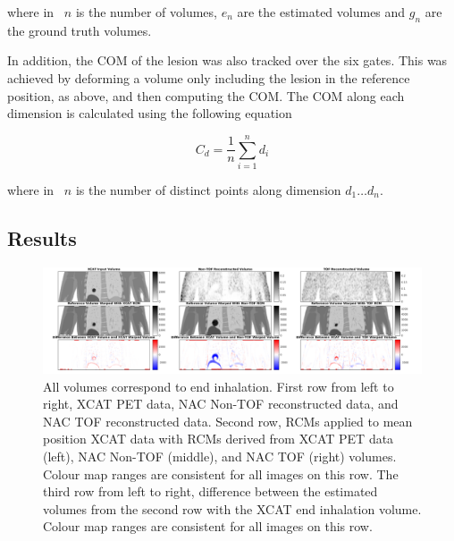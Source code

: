                 \noindent where in~ $n$ is the number of volumes, $e_n$ are the estimated volumes and $g_n$ are the ground truth volumes.
                
                In addition, the \gls{COM} of the lesion was also tracked over the six gates. This was achieved by deforming a volume only including the lesion in the reference position, as above, and then computing the \gls{COM}. The \gls{COM} along each dimension is calculated using the following equation
                
                \begin{equation} \label{eq:impact_of_tof_on_respiratory_motion_model_estimation_using_pre_gated_no_intra_cycle_motion_nac_pet_methods_com}
                   C_{d} = \frac{1}{n}\sum_{i = 1}^{n} d_{i}
                \end{equation}
                
                \noindent where in~ $n$ is the number of distinct points along dimension $d_1 \dotso d_n$.
            
        \subsection{Results} \label{sec:impact_of_tof_on_respiratory_motion_model_estimation_using_pre_gated_no_intra_cycle_motion_nac_pet_results}
            \begin{figure}
                \centering
                
                \includegraphics[width=1.0\linewidth]{figures/motion_correction_1_results_1_output.png}
                
                \captionsetup{singlelinecheck=false}
                \caption{
                    All volumes correspond to end inhalation. First row from left to right, \gls{XCAT} \gls{PET} data, \gls{NAC} \gls{Non-TOF} reconstructed data, and \gls{NAC} \gls{TOF} reconstructed data. Second row, \glspl{RCM} applied to mean position \gls{XCAT} data with \glspl{RCM} derived from \gls{XCAT} \gls{PET} data (left), \gls{NAC} \gls{Non-TOF} (middle), and \gls{NAC} \gls{TOF} (right) volumes. Colour map ranges are consistent for all images on this row. The third row from left to right, difference between the estimated volumes from the second row with the \gls{XCAT} end inhalation volume. Colour map ranges are consistent for all images on this row.
                }
                \label{fig:impact_of_tof_on_respiratory_motion_model_estimation_using_pre_gated_no_intra_cycle_motion_nac_pet_results_output}
            \end{figure}
            
